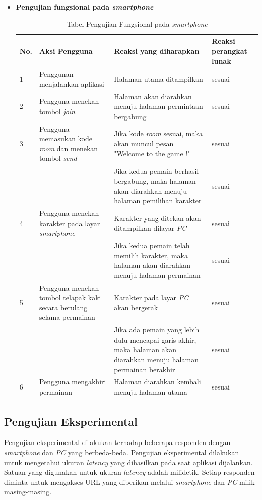 \begin{itemize}
	\item \textbf{Pengujian fungsional pada \textit{smartphone}}
\begin{table}[H]
	\centering
	\caption{Tabel Pengujian Fungsional pada \textit{smartphone}}
	\begin{tabular}{|p{0.35cm}| p{3.5cm}| p{7cm}| p{2.5cm}|} \hline
		No. & Aksi Pengguna & Reaksi yang diharapkan & Reaksi perangkat lunak \\ \hline
		1 & Penggunan menjalankan aplikasi & Halaman utama ditampilkan & sesuai \\ \hline 
		2 & Pengguna menekan tombol \textit{join} & Halaman akan diarahkan menuju halaman permintaan bergabung & sesuai \\ \hline
		3 & Pengguna memasukan kode \textit{room} dan menekan tombol \textit{send} & Jika kode \textit{room} sesuai, maka akan muncul pesan "Welcome to the game !" & sesuai \\ \hline
		& & Jika kedua pemain berhasil bergabung, maka halaman akan diarahkan menuju halaman pemilihan karakter & sesuai \\ \hline
		4 & Pengguna menekan karakter pada layar \textit{smartphone} & Karakter yang ditekan akan ditampilkan dilayar \textit{PC} & sesuai \\ \hline
		& & Jika kedua pemain telah memilih karakter, maka halaman akan diarahkan menuju halaman permainan & sesuai \\ \hline
		5 & Pengguna menekan tombol telapak kaki secara berulang selama permainan & Karakter pada layar \textit{PC} akan bergerak & sesuai\\ \hline
		& & Jika ada pemain yang lebih dulu mencapai garis akhir, maka halaman akan diarahkan menuju halaman permainan berakhir & sesuai \\ \hline
		6 & Pengguna mengakhiri permainan & Halaman diarahkan kembali menuju halaman utama & sesuai \\ \hline
	\end{tabular}
	\label{table:fungsionalSmartphone}
\end{table}
\end{itemize} 
\subsection{Pengujian Eksperimental}
Pengujian eksperimental dilakukan terhadap beberapa responden dengan \textit{smartphone} dan \textit{PC} yang berbeda-beda. Pengujian eksperimental dilakukan untuk mengetahui ukuran \textit{latency} yang dihasilkan pada saat aplikasi dijalankan. Satuan yang digunakan untuk ukuran \textit{latency} adalah milidetik. Setiap responden diminta untuk mengakses URL yang diberikan melalui \textit{smartphone} dan \textit{PC} milik masing-masing. 


